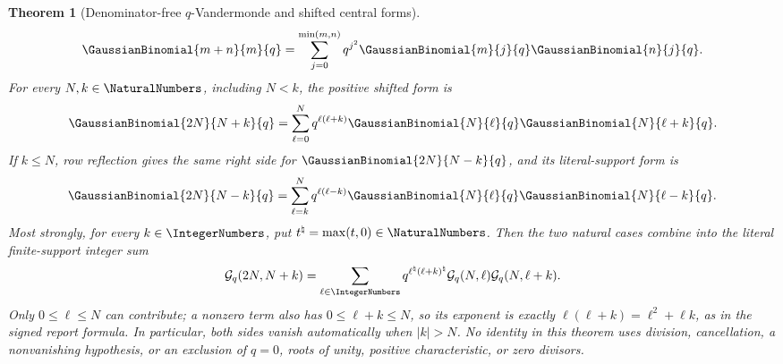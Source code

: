 \documentclass[11pt,oneside]{article}
\newtheorem{theorem}{Theorem}[section]
\theoremstyle{definition}
\theoremstyle{remark}
\begin{document}
\begin{theorem}[Denominator-free \(q\)-Vandermonde and shifted central forms]
\begin{equation}
 \GaussianBinomial{m+n}{m}{q}
 =\sum_{j=0}^{\min(m,n)}q^{j^2}\GaussianBinomial{m}{j}{q}\GaussianBinomial{n}{j}{q}.
                                                               \label{eq:q-vandermonde-central-min}
\end{equation}
For every \(N,k\in\NaturalNumbers\), including \(N<k\), the positive shifted form is
\begin{equation}
 \GaussianBinomial{2N}{N+k}{q}
 =\sum_{\ell=0}^{N}q^{\ell(\ell+k)}
   \GaussianBinomial{N}{\ell}{q}\GaussianBinomial{N}{\ell+k}{q}.                    \label{eq:q-vandermonde-shift-plus}
\end{equation}
If \(k\le N\), row reflection gives the same right side for
\(\GaussianBinomial{2N}{N-k}{q}\), and its literal-support form is
\begin{equation}
 \GaussianBinomial{2N}{N-k}{q}
 =\sum_{\ell=k}^{N}q^{\ell(\ell-k)}
   \GaussianBinomial{N}{\ell}{q}\GaussianBinomial{N}{\ell-k}{q}.                    \label{eq:q-vandermonde-shift-minus}
\end{equation}
Most strongly, for every \(k\in\IntegerNumbers\), put \(t^\natural=\max(t,0)\in\NaturalNumbers\).
Then the two natural cases combine into the literal finite-support integer sum
\begin{equation}
 \mathcal G_q(2N,N+k)
 =\sum_{\ell\in\IntegerNumbers}
   q^{\ell^\natural(\ell+k)^\natural}
   \mathcal G_q(N,\ell)\mathcal G_q(N,\ell+k).           \label{eq:q-vandermonde-shift-int}
\end{equation}
Only \(0\le\ell\le N\) can contribute; a nonzero term also has
\(0\le\ell+k\le N\), so its exponent is exactly
\(\ell(\ell+k)=\ell^2+\ell k\), as in the signed report formula.  In
particular, both sides vanish automatically when \(\lvert k\rvert>N\).
No identity in this theorem uses division, cancellation, a nonvanishing
hypothesis, or an exclusion of \(q=0\), roots of unity, positive
characteristic, or zero divisors.
\end{theorem}
\end{document}
